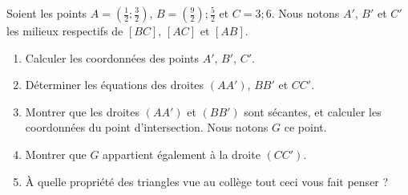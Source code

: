 
\begin{exercice}\label{exosmath-0241}

    Soient les points \( A=(\frac{1}{ 2 };\frac{ 3 }{ 2 })\), \( B=(\frac{ 9 }{2});\frac{ 5 }{2}\) et \( C=3;6\). Nous notons $A'$, \( B'\) et \( C'\) les milieux respectifs de \( [BC]\), \( [AC]\) et \( [AB]\).
    \begin{enumerate}
        \item
            Calculer les coordonnées des points \( A'\), \( B'\), \( C'\).
        \item
            Déterminer les équations des droites \( (AA')\), \( BB'\) et \( CC'\).
        \item
            Montrer que les droites \( (AA')\) et \( (BB')\) sont sécantes, et calculer les coordonnées du point d'intersection. Nous notons \( G\) ce point.
        \item
            Montrer que \( G\) appartient également à la droite \( (CC')\).
        \item
            À quelle propriété des triangles vue au collège tout ceci vous fait penser ?
    \end{enumerate}

\end{exercice}
